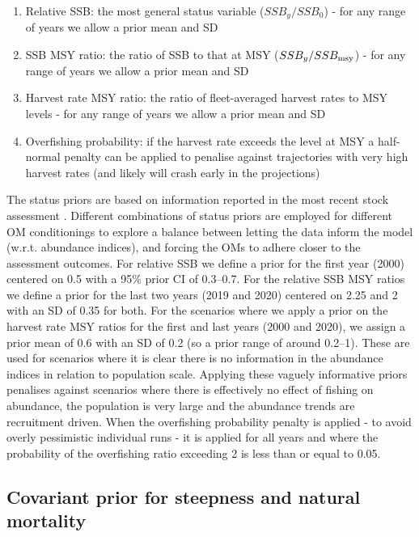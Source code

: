 \documentclass[11pt]{article}
\begin{document}
\begin{enumerate}
    \item Relative SSB: the most general status variable ($SSB_y/SSB_0$) - for any range of years we allow a prior mean and SD
    \item SSB MSY ratio: the ratio of SSB to that at MSY ($SSB_y/SSB_{\rm msy}$) - for any range of years we allow a prior mean and SD
    \item Harvest rate MSY ratio: the ratio of fleet-averaged harvest rates to MSY levels - for any range of years we allow a prior mean and SD
    \item Overfishing probability: if the harvest rate exceeds the level at MSY a half-normal penalty can be applied to penalise against trajectories with very high harvest rates (and likely will crash early in the projections)
\end{enumerate}

The status priors are based on information reported in the most recent stock assessment \cite{albsa}. Different combinations of status priors are employed for different OM conditionings to explore a balance between letting the data inform the model (w.r.t. abundance indices), and forcing the OMs to adhere closer to the assessment outcomes. For relative SSB we define a prior for the first year (2000) centered on 0.5 with a 95\% prior CI of 0.3--0.7. For the relative SSB MSY ratios we define a prior for the last two years (2019 and 2020) centered on 2.25 and 2 with an SD of 0.35 for both. For the scenarios where we apply a prior on the harvest rate MSY ratios for the first and last years (2000 and 2020), we assign a prior mean of 0.6 with an SD of 0.2 (so a prior range of around 0.2--1). These are used for scenarios where it is clear there is no information in the abundance indices in relation to population scale. Applying these vaguely informative priors penalises against scenarios where there is effectively no effect of fishing on abundance, the population is very large and the abundance trends are recruitment driven. When the overfishing probability penalty is applied - to avoid overly pessimistic individual runs - it is applied for all years and where the probability of the overfishing ratio exceeding 2 is less than or equal to 0.05.

\subsection{Covariant prior for steepness and natural mortality}
\end{document}
